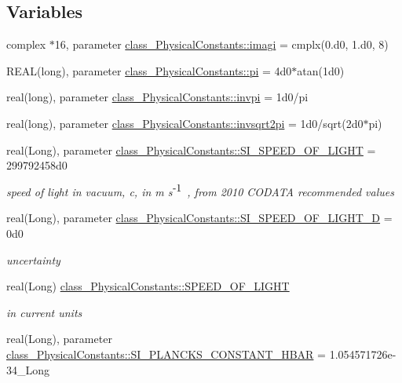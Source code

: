 \subsection*{Variables}
\begin{DoxyCompactItemize}
\item 
complex $\ast$16, parameter \hyperlink{namespaceclass__PhysicalConstants_ac45be97becb491b16f05e8f0695d03ba}{class\_\-PhysicalConstants::imagi} = cmplx(0.d0, 1.d0, 8)
\item 
REAL(long), parameter \hyperlink{namespaceclass__PhysicalConstants_a42d7c56a3a05fa73be90f78ecc833f34}{class\_\-PhysicalConstants::pi} = 4d0$\ast$atan(1d0)
\item 
real(long), parameter \hyperlink{namespaceclass__PhysicalConstants_a3c84b6c8e14a53682461f34fd08584bb}{class\_\-PhysicalConstants::invpi} = 1d0/pi
\item 
real(long), parameter \hyperlink{namespaceclass__PhysicalConstants_a7dee25e7580520ed07ea8ea46cd96706}{class\_\-PhysicalConstants::invsqrt2pi} = 1d0/sqrt(2d0$\ast$pi)
\item 
real(Long), parameter \hyperlink{namespaceclass__PhysicalConstants_a30ec603cc75f0d29a1429faabdce848c}{class\_\-PhysicalConstants::SI\_\-SPEED\_\-OF\_\-LIGHT} = 299792458d0
\begin{DoxyCompactList}\small\item\em speed of light in vacuum, c, in m s$^{\mbox{-\/1}}$ , from 2010 CODATA recommended values \item\end{DoxyCompactList}\item 
real(Long), parameter \hyperlink{namespaceclass__PhysicalConstants_aa56bb92d92839b2fef368f7be3640777}{class\_\-PhysicalConstants::SI\_\-SPEED\_\-OF\_\-LIGHT\_\-D} = 0d0
\begin{DoxyCompactList}\small\item\em uncertainty \item\end{DoxyCompactList}\item 
real(Long) \hyperlink{namespaceclass__PhysicalConstants_a44b1992769a901faa8885324ef348271}{class\_\-PhysicalConstants::SPEED\_\-OF\_\-LIGHT}
\begin{DoxyCompactList}\small\item\em in current units \item\end{DoxyCompactList}\item 
real(Long), parameter \hyperlink{namespaceclass__PhysicalConstants_a600c7e7a8a69f32b4bcab8d52fc15073}{class\_\-PhysicalConstants::SI\_\-PLANCKS\_\-CONSTANT\_\-HBAR} = 1.054571726e-\/34\_\-Long

\end{DoxyCompactItemize}
